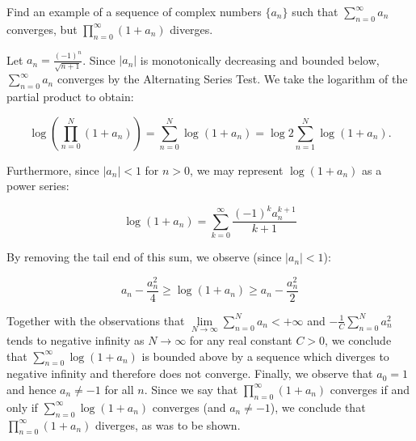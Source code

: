 Find an example of a sequence of complex numbers $\{a_n\}$ such that $\sum\limits_{n=0}^{\infty} a_n$ converges, but 
\linebreak $\prod\limits_{n=0}^{\infty} (1 + a_n)$ diverges.

\begin{solution}
  Let $a_n = \frac{(-1)^n}{\sqrt{n+1}}$. Since $|a_n|$ is monotonically decreasing and bounded below, 
  $\sum\limits_{n=0}^{\infty} a_n$ converges by the Alternating Series Test. We take the logarithm of the partial 
  product to obtain:

  $$
  \log \left( \prod_{n=0}^{N} (1 + a_n) \right) 
    = \sum_{n=0}^{N} \log(1 + a_n) 
    = \log 2 \sum_{n=1}^{N} \log(1 + a_n).
  $$

  Furthermore, since $|a_n| < 1$ for $n > 0$, we may represent $\log(1 + a_n)$ as a power series:

  $$
  \log{(1 + a_n)} = \sum_{k=0}^{\infty} \frac{(-1)^k a_n^{k+1}}{k+1}
  $$

  By removing the tail end of this sum, we observe (since $|a_n| < 1$):

  $$
  a_n - \frac{a_n^2}{4} \ge \log(1 + a_n) \ge a_n - \frac{a_n^2}{2}
  $$

  Together with the observations that $\lim\limits_{N \to \infty} \sum\limits_{n=0}^{N} a_n < +\infty$ and 
  $-\frac{1}{C} \sum\limits_{n=0}^{N} a_n^2$ tends to negative infinity as $N \to \infty$ for any real constant $C > 0$, 
  we conclude that $\sum\limits_{n=0}^{\infty} \log(1 + a_n)$ is bounded above by a sequence which diverges to negative 
  infinity and therefore does not converge. Finally, we observe that $a_0 = 1$ and hence $a_n \neq -1$ for all $n$. 
  Since we say that $\prod\limits_{n=0}^{\infty} (1 + a_n)$ converges if and only if 
  $\sum\limits_{n=0}^{\infty} \log(1 + a_n)$ converges (and $a_n \neq -1$), we conclude that 
  $\prod\limits_{n=0}^{\infty} (1 + a_n)$ diverges, as was to be shown.
  \ \\
\end{solution}